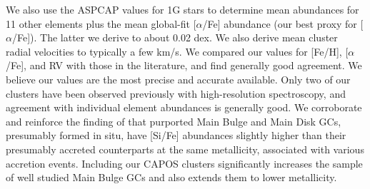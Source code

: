 \documentclass[onecolumn]{aa}
\begin{document}
We also use the ASPCAP values for 1G stars to determine mean abundances for 11 other elements plus the mean global-fit [$\alpha$/Fe] abundance (our best proxy for [$\alpha$/Fe]). The latter we derive to about 0.02 dex. We also derive mean cluster radial velocities to typically a few km/s. We compared our values for [Fe/H], [$\alpha$/Fe], and RV with those in the literature, and find generally good agreement. We believe our values are the most precise and accurate available. Only two of our clusters have been observed previously with high-resolution spectroscopy, and agreement with individual element abundances is generally good. We corroborate and reinforce the finding of \citet{Horta2020} that purported Main Bulge and
Main Disk GCs, presumably formed in situ, have [Si/Fe] abundances slightly higher than their presumably accreted counterparts at the same metallicity, associated with various accretion events. Including our CAPOS clusters 
significantly increases the sample of well studied Main Bulge GCs and also extends them to lower metallicity.
\end{document}
